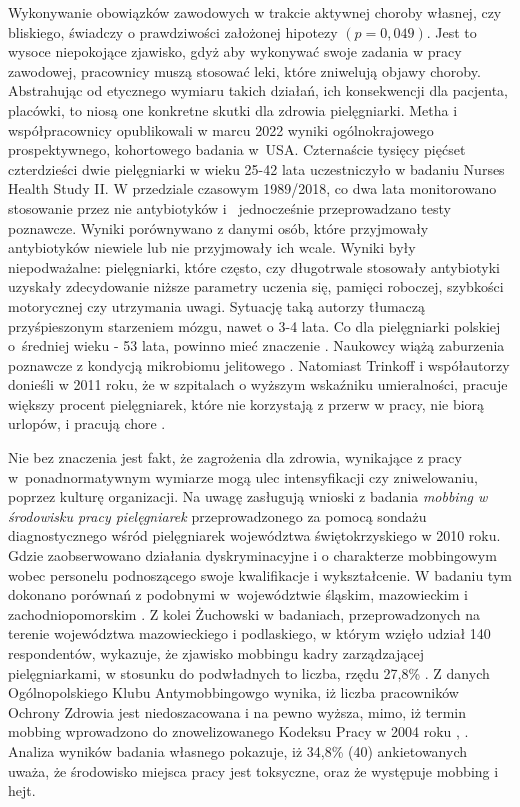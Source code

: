 \documentclass[a4paper,12pt,twoside,openright]{mwrep}
\begin{document}
Wykonywanie obowiązków zawodowych w trakcie aktywnej choroby własnej, czy bliskiego, świadczy o prawdziwości założonej hipotezy $( p=0,049)$. Jest to wysoce niepokojące zjawisko, gdyż aby wykonywać swoje zadania w pracy zawodowej, pracownicy muszą stosować   leki, które  zniwelują objawy choroby. Abstrahując od etycznego wymiaru takich działań,  ich konsekwencji dla pacjenta, placówki, to niosą one konkretne skutki dla zdrowia pielęgniarki. Metha i współpracownicy opublikowali w marcu 2022 wyniki ogólnokrajowego prospektywnego, kohortowego badania  w~USA. Czternaście tysięcy pięćset czterdzieści dwie  pielęgniarki w wieku 25-42 lata uczestniczyło w badaniu Nurses Health Study II. W przedziale czasowym 1989/2018,  co dwa lata monitorowano stosowanie przez nie antybiotyków i ~jednocześnie przeprowadzano testy poznawcze. Wyniki porównywano z danymi osób, które przyjmowały antybiotyków niewiele lub nie przyjmowały ich wcale. Wyniki były niepodważalne: pielęgniarki, które często, czy długotrwale stosowały antybiotyki uzyskały zdecydowanie niższe parametry uczenia się, pamięci roboczej, szybkości motorycznej czy utrzymania uwagi. Sytuację taką autorzy tłumaczą przyśpieszonym starzeniem mózgu, nawet o 3-4 lata.  Co dla  pielęgniarki polskiej o~średniej wieku - 53 lata, powinno mieć znaczenie \cite{statystyka}.  Naukowcy  wiążą zaburzenia poznawcze z  kondycją mikrobiomu jelitowego \cite{metha}. Natomiast Trinkoff i współautorzy donieśli w 2011 roku, że w szpitalach o wyższym wskaźniku umieralności, pracuje większy procent pielęgniarek, które nie korzystają z przerw w pracy, nie biorą urlopów, i pracują chore \cite{trinkoff}.


Nie bez znaczenia jest fakt, że zagrożenia  dla zdrowia, wynikające z pracy w~ponadnormatywnym wymiarze mogą ulec intensyfikacji czy zniwelowaniu, poprzez kulturę organizacji. Na uwagę zasługują wnioski z badania \textit{mobbing w środowisku pracy pielęgniarek} przeprowadzonego za pomocą sondażu diagnostycznego wśród pielęgniarek województwa świętokrzyskiego w 2010 roku. Gdzie zaobserwowano działania dyskryminacyjne i o charakterze mobbingowym wobec personelu podnoszącego swoje kwalifikacje i wykształcenie. W badaniu tym dokonano porównań z podobnymi w~województwie śląskim, mazowieckim i zachodniopomorskim \cite{mobbing}. Z kolei Żuchowski w badaniach, przeprowadzonych na terenie województwa mazowieckiego i podlaskiego, w którym wzięło udział 140 respondentów, wykazuje, że zjawisko mobbingu kadry zarządzającej pielęgniarkami, w stosunku do podwładnych to liczba, rzędu 27,8\% \cite{zuchowski}. Z danych Ogólnopolskiego Klubu Antymobbingowgo wynika, iż liczba pracowników Ochrony Zdrowia jest niedoszacowana i na pewno wyższa, mimo,  iż termin mobbing wprowadzono do znowelizowanego Kodeksu Pracy w 2004 roku \cite{grabowski}, \cite{kodeks}. Analiza wyników badania własnego pokazuje, iż 34,8\% (40) ankietowanych uważa, że środowisko miejsca pracy jest toksyczne,  oraz że występuje mobbing i hejt.
\end{document}
